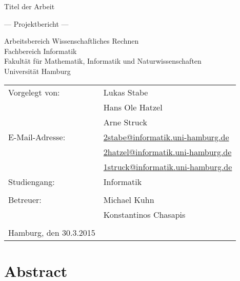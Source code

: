 \documentclass[
	12pt,
	a4paper,
	BCOR10mm,
	DIV14,
	listof=totoc,
	bibliography=totoc,
	headsepline
]{scrreprt}
\begin{document}
\begin{titlepage}
	\begin{center}
		{\titlefont\huge Titel der Arbeit\par}

		\bigskip
		\bigskip

		{\titlefont\Large --- Projektbericht ---\par}

		\bigskip
		\bigskip

		{\large Arbeitsbereich Wissenschaftliches Rechnen\\
		Fachbereich Informatik\\
		Fakultät für Mathematik, Informatik und Naturwissenschaften\\
		Universität Hamburg\par}
	\end{center}

	\vfill

	{\large \begin{tabular}{ll}
		Vorgelegt von: & Lukas Stabe \\
			& Hans Ole Hatzel \\
			& Arne Struck \\
		E-Mail-Adresse: 
			& \href{mailto:2stabe@informatik.uni-hamburg.de} {2stabe@informatik.uni-hamburg.de} \\			
			& \href{mailto:2hatzel@informatik.uni-hamburg.de}{2hatzel@informatik.uni-hamburg.de} \\
			& \href{mailto:1struck@informatik.uni-hamburg.de}{1struck@informatik.uni-hamburg.de} \\ 
		Studiengang: & Informatik \\
		\\
		Betreuer: & Michael Kuhn \\
			& Konstantinos Chasapis \\
		\\
		Hamburg, den 30.3.2015
	\end{tabular}\par}
\end{titlepage}

\chapter*{Abstract}

\thispagestyle{empty}

   

\tableofcontents
\end{document}
